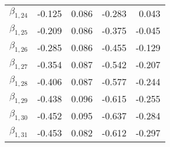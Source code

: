 \begin{tabular}{lrrrr}
$\beta_{1,24}$ & -0.125 &     0.086 &   -0.283 &     0.043 \\
$\beta_{1,25}$ & -0.209 &     0.086 &   -0.375 &    -0.045 \\
$\beta_{1,26}$ & -0.285 &     0.086 &   -0.455 &    -0.129 \\
$\beta_{1,27}$ & -0.354 &     0.087 &   -0.542 &    -0.207 \\
$\beta_{1,28}$ & -0.406 &     0.087 &   -0.577 &    -0.244 \\
$\beta_{1,29}$ & -0.438 &     0.096 &   -0.615 &    -0.255 \\
$\beta_{1,30}$ & -0.452 &     0.095 &   -0.637 &    -0.284 \\
$\beta_{1,31}$ & -0.453 &     0.082 &   -0.612 &    -0.297 \\
\bottomrule
\end{tabular}
